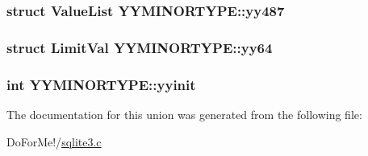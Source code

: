 \hypertarget{union_y_y_m_i_n_o_r_t_y_p_e_a565d289fa56f79ebd699d4e7decea365}{
\subsubsection[{yy487}]{\setlength{\rightskip}{0pt plus 5cm}struct {\bf Value\-List} Y\-Y\-M\-I\-N\-O\-R\-T\-Y\-P\-E\-::yy487}}\label{union_y_y_m_i_n_o_r_t_y_p_e_a565d289fa56f79ebd699d4e7decea365}
\hypertarget{union_y_y_m_i_n_o_r_t_y_p_e_aeb6b77e9a54a740178f47c10d2263f39}{
\subsubsection[{yy64}]{\setlength{\rightskip}{0pt plus 5cm}struct {\bf Limit\-Val} Y\-Y\-M\-I\-N\-O\-R\-T\-Y\-P\-E\-::yy64}}\label{union_y_y_m_i_n_o_r_t_y_p_e_aeb6b77e9a54a740178f47c10d2263f39}
\hypertarget{union_y_y_m_i_n_o_r_t_y_p_e_a6cec97309f473b42b70a9738d7cbd5ba}{
\subsubsection[{yyinit}]{\setlength{\rightskip}{0pt plus 5cm}int Y\-Y\-M\-I\-N\-O\-R\-T\-Y\-P\-E\-::yyinit}}\label{union_y_y_m_i_n_o_r_t_y_p_e_a6cec97309f473b42b70a9738d7cbd5ba}


The documentation for this union was generated from the following file\-:\begin{DoxyCompactItemize}
\item 
Do\-For\-Me!/\hyperlink{sqlite3_8c}{sqlite3.\-c}\end{DoxyCompactItemize}
